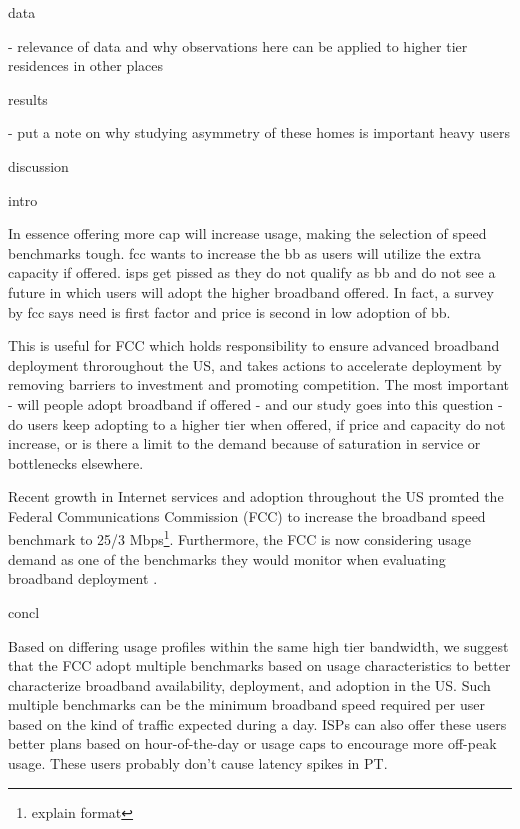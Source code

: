 data

- relevance of data and why observations here can be applied to higher tier residences in other places


results

- put a note on why studying asymmetry of these homes is important heavy users


discussion


intro


In essence offering more cap will increase usage, making the selection of speed benchmarks tough. fcc wants to increase the bb as users will utilize the extra capacity if offered. isps get pissed as they do not qualify as bb and do not see a future in which users will adopt the higher broadband offered. In fact, a survey by fcc says need is first factor and price is second in low adoption of bb.

This is useful for FCC which holds responsibility to ensure advanced broadband deployment throroughout the US, and takes actions to accelerate deployment by removing barriers to investment and promoting competition. The most important - will people adopt broadband if offered - and our study goes into this question - do users keep adopting to a higher tier when offered, if price and capacity do not increase, or is there a limit to the demand because of saturation in service or bottlenecks elsewhere.

Recent growth in Internet services and adoption throughout the US promted the Federal Communications Commission (FCC) to increase the broadband speed benchmark to 25/3 Mbps\footnote{explain format}. Furthermore, the FCC is now considering usage demand as one of the benchmarks they would monitor when evaluating broadband deployment \cite{fcc2015broadband-report}.


concl


Based on differing usage profiles within the same high tier bandwidth, we suggest that the FCC adopt multiple benchmarks based on usage characteristics to better characterize broadband availability, deployment, and adoption in the US. Such multiple benchmarks can be the minimum broadband speed required per user based on the kind of traffic expected during a day. ISPs can also offer these users better plans based on hour-of-the-day or usage caps to encourage more off-peak usage. These users probably don't cause latency spikes in PT.